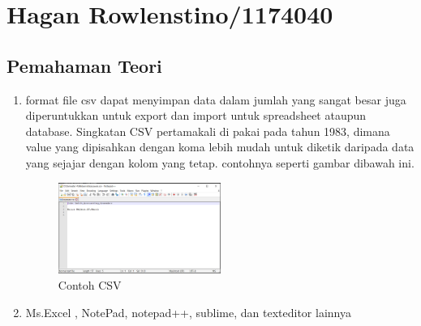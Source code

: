 \section{Hagan Rowlenstino/1174040}
	\subsection{Pemahaman Teori}
	\begin{enumerate}
	\item format file csv dapat menyimpan data dalam jumlah yang sangat besar juga diperuntukkan untuk export dan import untuk spreadsheet ataupun database. Singkatan CSV pertamakali di pakai pada tahun 1983, dimana value yang dipisahkan dengan koma lebih mudah untuk diketik daripada data yang sejajar dengan kolom yang tetap. contohnya seperti gambar dibawah ini.

	\begin{figure}[ht]
            \centerline{\includegraphics[width=0.5\textwidth]{figures/chapter4/1174040_csv.png}}
            \caption{Contoh CSV}
            \label{1174040_csv}
            \end{figure}

	\item Ms.Excel , NotePad, notepad++, sublime, dan texteditor lainnya


\end{enumerate}
